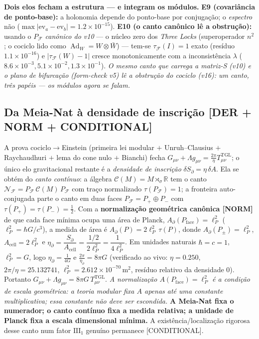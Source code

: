 \documentclass[11pt]{article}
\theoremstyle{definition}\newtheorem{deriv}{Derivação}
\begin{document}
\textbf{Dois elos fecham a estrutura --- e integram os módulos.} \textbf{E9 (covariância de ponto-base):} a holonomia depende do ponto-base por conjugação; o \emph{espectro} não ($\max|\mathrm{ev}_a-\mathrm{ev}_b|=1.2\times10^{-15}$). \textbf{E10 (o canto canônico lê a obstrução):} usando o $P_{\mathcal F}$ \emph{canônico do v10} --- o núcleo zero dos \emph{Three Locks} (superoperador $n^2$; o cociclo lido como $\operatorname{Ad}_W=W\otimes\bar W$) --- tem-se $\tau_{\mathcal F}(I)=1$ exato (resíduo $1.1\times10^{-16}$) e $|\tau_{\mathcal F}(W)-1|$ cresce monotonicamente com a inconsistência $\lambda$ ($8.6\times10^{-3}, 5.1\times10^{-2}, 1.3\times10^{-1}$). \emph{O mesmo canto que carrega a matriz-S (v10) e o plano de bifurcação (form-check v5) lê a obstrução do cociclo (v16): um canto, três papéis --- os módulos agora se falam.}

\subsection*{Da Meia-Nat à densidade de inscrição \textsf{[DER + NORM + CONDITIONAL]}}

A prova cociclo$\to$Einstein (primeira lei modular $+$ Unruh--Clausius $+$ Raychaudhuri $+$ lema do cone nulo $+$ Bianchi) fecha $G_{\mu\nu}+\Lambda g_{\mu\nu}=\tfrac{2\pi}{\eta}T^{\mathrm{TGL}}_{\mu\nu}$; o único elo gravitacional restante é a \emph{densidade de inscrição} $\delta S_\partial=\eta\,\delta A$. Ela se obtém do \emph{canto contínuo}: a álgebra $\mathcal C(M)=M\rtimes_\sigma\mathbb R$ tem o canto $\mathcal N_{\mathcal F}=P_{\mathcal F}\,\mathcal C(M)\,P_{\mathcal F}$ com traço normalizado $\tau(P_{\mathcal F})=1$; a fronteira auto-conjugada parte o canto em duas faces $P_{\mathcal F}=P_+\oplus P_-$ com $\tau(P_+)=\tau(P_-)=\tfrac12$. Com a \textbf{normalização geométrica canônica \textsf{[NORM]}} de que cada face mínima ocupa uma área de Planck, $A_\partial(P_{\mathrm{face}})=\ell_P^2$ ($\ell_P^2=\hbar G/c^3$), a medida de área é $A_\partial(P)=2\ell_P^2\,\tau(P)$, donde $A_\partial(P_\pm)=\ell_P^2$, $A_{\mathrm{cell}}=2\ell_P^2$ e $\eta_\partial=\dfrac{S_\partial}{A_{\mathrm{cell}}}=\dfrac{1/2}{2\ell_P^2}=\dfrac1{4\ell_P^2}$. Em unidades naturais $\hbar=c=1$, $\ell_P^2=G$, logo $\eta_\partial=\tfrac1{4G}$ e $\tfrac{2\pi}{\eta_\partial}=8\pi G$ (verificado ao vivo: $\eta=0.250$, $2\pi/\eta=25.132741$, $\ell_P^2=2.612\times10^{-70}\,\mathrm{m}^2$, resíduo relativo da densidade $0$). Portanto $G_{\mu\nu}+\Lambda g_{\mu\nu}=8\pi G\,T^{\mathrm{TGL}}_{\mu\nu}$. \emph{A normalização $A(P_{\mathrm{face}})=\ell_P^2$ é a condição de escala geométrica: a teoria modular fixa $A$ apenas até uma constante multiplicativa; essa constante não deve ser escondida.} \textbf{A Meia-Nat fixa o numerador; o canto contínuo fixa a medida relativa; a unidade de Planck fixa a escala dimensional mínima.} A existência/localização rigorosa desse canto num fator $\mathrm{III}_1$ genuíno permanece \textsf{[CONDITIONAL]}.
\end{document}
